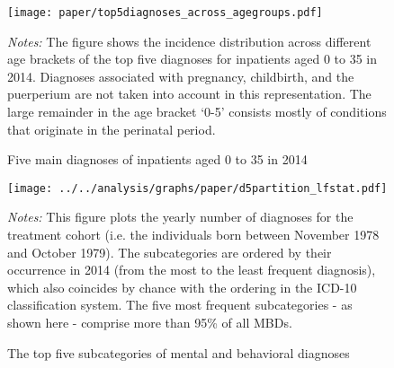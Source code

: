 



\vspace*{\fill}
\begin{figure}[H]\centering
	\caption{Five main diagnoses of inpatients aged 0 to 35 in 2014}\label{fig_mlch: top5diagnosis_in_2014_across_agegroups}
	\texttt{[image: paper/top5diagnoses\_across\_agegroups.pdf]}
	\begin{minipage}{\linewidth}
		\scriptsize{\emph{Notes:} The figure shows the incidence distribution across different age brackets of the top five diagnoses for inpatients aged 0 to 35 in 2014. Diagnoses associated with pregnancy, childbirth, and the puerperium are not taken into account in this representation. The large remainder in the age bracket `0-5' consists mostly of conditions that originate in the perinatal period.}
	\end{minipage}
\end{figure}
\vspace*{\fill}\clearpage





\vspace*{\fill}
\begin{figure}[H]\centering
	\caption{The top five subcategories of mental and behavioral diagnoses}\label{fig_mlch: d5partition}
	\texttt{[image: ../../analysis/graphs/paper/d5partition\_lfstat.pdf]}
	\scriptsize
	\begin{minipage}{0.9\linewidth}
	\emph{Notes:} This figure plots the yearly number of diagnoses for the treatment cohort (i.e. the individuals born between November 1978 and October 1979). The subcategories are ordered by their occurrence in 2014 (from the most to the least frequent diagnosis), which also coincides by chance with the ordering in the ICD-10 classification system. The five most frequent subcategories - as shown here - comprise more than 95\% of all MBDs. 
	\end{minipage}
\end{figure}
\vspace*{\fill}\clearpage


